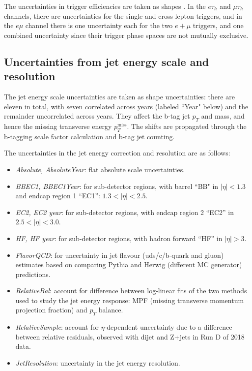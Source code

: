 The uncertainties in trigger efficiencies are taken as shapes \cite{twiki_TAU_POG_tauidrecommendationforrun2}. In the $e\tau_{h}$ and $\mu\tau_{h}$ channels, there are uncertainties for the single and cross lepton triggers, and in the $e\mu$ channel there is one uncertainty each for the two $e+\mu$ triggers, and one combined uncertainty since their trigger phase spaces are not mutually exclusive.

\subsection{Uncertainties from jet energy scale and resolution}
\label{subsec:JEC_sys}
The jet energy scale uncertainties are taken as shape uncertainties: there are eleven in total, with seven correlated across years (labeled ``Year" below) and the remainder uncorrelated across years. They affect the b-tag jet $p_{T}$ and mass, and hence the missing transverse energy $p_{T}^{\text{miss}}$. The shifts are propagated through the b-tagging scale factor calculation and b-tag jet counting. 

The uncertainties in the jet energy correction and resolution \cite{CMS-JME-13-004} \cite{twiki_JetEnergyScale_Uncertainty_Sources_JERC} are as follows:
    \begin{itemize}
        \item \textit{Absolute, AbsoluteYear}: flat absolute scale uncertainties.
        \item \textit{BBEC1, BBEC1Year}: for sub-detector regions, with barrel ``BB" in $|\eta| < 1.3$ and endcap region 1 ``EC1'': $1.3 < |\eta| < 2.5$.
        \item \textit{EC2, EC2 year}: for sub-detector regions, with endcap region 2 ``EC2'' in $2.5 < |\eta| < 3.0$.
        \item \textit{HF, HF year}: for sub-detector regions, with hadron forward ``HF'' in $|\eta| > 3$.
        \item \textit{FlavorQCD}: for uncertainty in jet flavour (uds/c/b-quark and gluon) estimates based on comparing Pythia and Herwig (different MC generator) predictions. 
        \item \textit{RelativeBal}: account for difference between log-linear fits of the two methods used to study the jet energy response: MPF (missing transverse momentum projection fraction) and $p_{T}$ balance.
        \item \textit{RelativeSample}: account for $\eta$-dependent uncertainty due to a difference between relative residuals, observed with dijet and Z+jets in Run D of 2018 data.
        \item \textit{JetResolution}: uncertainty in the jet energy resolution.
    \end{itemize}

